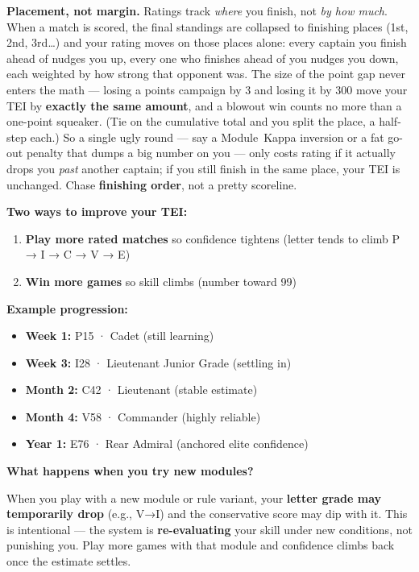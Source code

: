 \documentclass[11pt]{article}
\providecommand{\tightlist}{%
  \setlength{\itemsep}{0pt}\setlength{\parskip}{0pt}}
\begin{document}
\textbf{Placement, not margin.} Ratings track \emph{where} you finish,
not \emph{by how much}. When a match is scored, the final standings are
collapsed to finishing places (1st, 2nd, 3rd\ldots) and your rating
moves on those places alone: every captain you finish ahead of nudges
you up, every one who finishes ahead of you nudges you down, each
weighted by how strong that opponent was. The size of the point gap
never enters the math --- losing a points campaign by 3 and losing it by
300 move your TEI by \textbf{exactly the same amount}, and a blowout win
counts no more than a one-point squeaker. (Tie on the cumulative total
and you split the place, a half-step each.) So a single ugly round ---
say a Module~Kappa inversion or a fat go-out penalty that dumps a big
number on you --- only costs rating if it actually drops you \emph{past}
another captain; if you still finish in the same place, your TEI is
unchanged. Chase \textbf{finishing order}, not a pretty scoreline.

\textbf{Two ways to improve your TEI:}
\begin{enumerate}
\def\labelenumi{\arabic{enumi}.}
\tightlist
\item
  \textbf{Play more rated matches} so confidence tightens (letter tends
  to climb P → I → C → V → E)
\item
  \textbf{Win more games} so skill climbs (number toward 99)
\end{enumerate}

\textbf{Example progression:}
\begin{itemize}
\tightlist
\item
  \textbf{Week 1:} P15 · Cadet (still learning)
\item
  \textbf{Week 3:} I28 · Lieutenant Junior Grade (settling in)
\item
  \textbf{Month 2:} C42 · Lieutenant (stable estimate)
\item
  \textbf{Month 4:} V58 · Commander (highly reliable)
\item
  \textbf{Year 1:} E76 · Rear Admiral (anchored elite confidence)
\end{itemize}

\textbf{What happens when you try new modules?}

When you play with a new module or rule variant, your \textbf{letter
grade may temporarily drop} (e.g., V→I) and the conservative score may
dip with it. This is intentional --- the system is
\textbf{re-evaluating} your skill under new conditions, not punishing
you. Play more games with that module and confidence climbs back once
the estimate settles.
\end{document}
